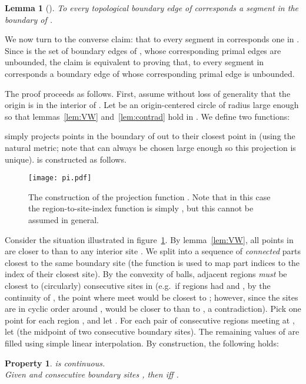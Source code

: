 \documentclass[11pt]{article}
\newtheorem{lemma}{Lemma}
\newtheorem{property}{Property}
\begin{document}
\begin{lemma}[]\label{boundary_easy}
 To every topological boundary edge of  corresponds a segment in the boundary of .
\end{lemma}



We now turn to the converse claim: that to every segment 
in  corresponds one in . Since  is the set of boundary edges of , whose corresponding primal edges 
are unbounded, the claim is equivalent to proving that, to every segment
in  corresponds a boundary edge  of  whose corresponding primal edge  is unbounded. 

The proof proceeds as follows. First, assume without loss of generality  that the origin is in the interior of . 
Let   be an origin-centered circle 
	of radius  large enough so that lemmas~\ref{lem:VW} and~\ref{lem:contrad} hold in . 
We define two  functions: 

  simply projects points in the boundary of  out to their closest point in  
(using the natural metric; note that  can always be chosen large enough so this projection is unique). 
 is constructed as follows. 


\begin{figure}[htbp]
   \centering
   	\texttt{[image: pi.pdf]} \caption{The construction of the projection function . 
   Note that in this case the region-to-site-index function is simply , but this cannot be assumed in general. }
   \label{fig:pi}
\end{figure}

\thefoo\label{text:boundary}
Consider the situation illustrated in figure~\ref{fig:pi}. 
By lemma~\ref{lem:VW}, all points in  are closer to  than to any interior site . 
We split  into 
	a sequence  of \emph{connected} parts closest 
	to the same boundary site  (the function  is used to map part indices to the index of their closest site). 
By the convexity of balls, 
	adjacent regions \emph{must} be closest to (circularly) consecutive sites in  
	(e.g.~if regions  had  and , 
	 by the continuity of , the point  where  meet would be closest to ; 
	 however, since the sites  are in cyclic order around , 
 would be closer to  than to , a contradiction). 
Pick one point  for each region , and let . 
For each pair of consecutive regions  meeting at , 
	let  (the midpoint of two consecutive boundary sites). 
The remaining values of  are filled using simple linear interpolation. 
By construction, the following holds:
\begin{property}\label{prop:pi}
  is continuous. \\
\hspace*{0.91in} Given  and consecutive boundary sites , 
	then  iff . 
\end{property}
\end{document}
